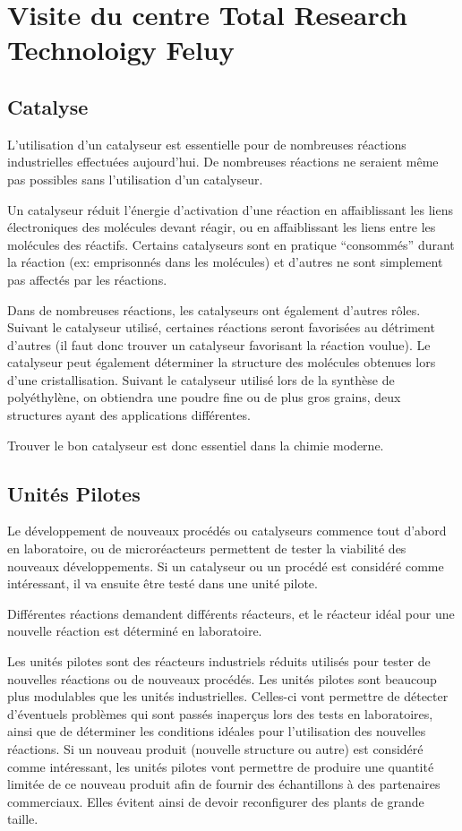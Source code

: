 \documentclass[a4paper, oneside, 12pt]{article}
\begin{document}
\section{Visite du centre Total Research Technoloigy Feluy}

\subsection{Catalyse}
\label{subsec:catalyse}

L'utilisation d'un catalyseur est essentielle pour de nombreuses réactions industrielles 
effectuées aujourd'hui. De nombreuses réactions ne seraient même pas possibles sans 
l'utilisation d'un catalyseur.
 
Un catalyseur réduit l'énergie d'activation d'une réaction en affaiblissant les liens
électroniques des molécules devant réagir, ou en affaiblissant les liens entre les 
molécules des réactifs. Certains catalyseurs sont en pratique ``consommés'' durant 
la réaction (ex: emprisonnés dans les molécules) et d'autres ne sont simplement pas 
affectés par les réactions. 

Dans de nombreuses réactions, les catalyseurs ont également d'autres rôles. 
Suivant le catalyseur utilisé, certaines réactions seront favorisées au détriment 
d'autres (il faut donc trouver un catalyseur favorisant la réaction voulue). 
Le catalyseur peut également déterminer la structure des molécules obtenues lors 
d'une cristallisation. Suivant le catalyseur utilisé lors de la synthèse de polyéthylène,
on obtiendra une poudre fine ou de plus gros grains,
deux structures ayant des applications différentes.
 
Trouver le bon catalyseur est donc essentiel dans la chimie moderne.
 
\subsection{Unités Pilotes}
 
Le développement de nouveaux procédés ou catalyseurs commence tout d'abord en laboratoire,
ou de microréacteurs permettent de tester la viabilité des nouveaux développements.
Si un catalyseur ou un procédé est considéré comme intéressant,
il va ensuite être testé dans une unité pilote. 

Différentes réactions demandent différents réacteurs,
et le réacteur idéal pour une nouvelle réaction est déterminé en laboratoire.
 
Les unités pilotes sont des réacteurs industriels réduits utilisés pour tester de
nouvelles réactions ou de nouveaux procédés. Les unités pilotes sont beaucoup plus
modulables que les unités industrielles. Celles-ci vont permettre de détecter
d'éventuels problèmes qui sont passés inaperçus lors des tests en laboratoires,
ainsi que de déterminer les conditions idéales pour l'utilisation des nouvelles réactions.
Si un nouveau produit (nouvelle structure ou autre) est considéré comme intéressant,
les unités pilotes vont permettre de produire une quantité limitée de ce nouveau
produit afin de fournir des échantillons à des partenaires commerciaux.
Elles évitent ainsi de devoir reconfigurer des plants de grande taille.
\end{document}
